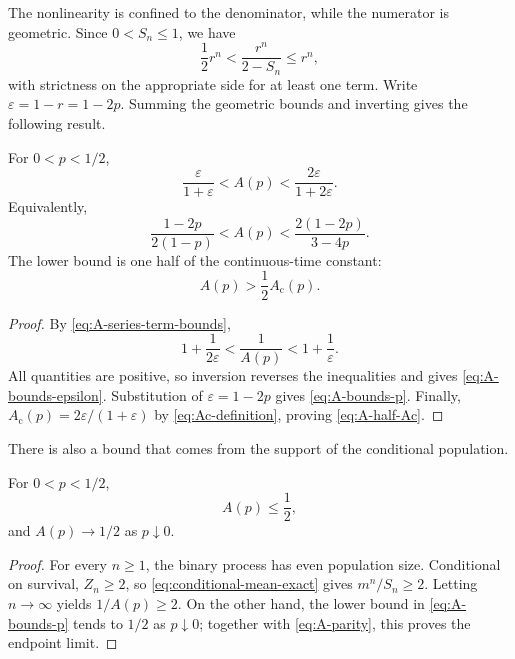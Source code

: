 The nonlinearity is confined to the denominator, while the numerator is geometric.
Since \(0<S_n\leq1\), we have
\begin{equation}
  \frac12r^n<\frac{r^n}{2-S_n}\leq r^n,
  \label{eq:A-series-term-bounds}
\end{equation}
with strictness on the appropriate side for at least one term.  Write
\(\varepsilon=1-r=1-2p\).  Summing the geometric bounds and inverting gives the
following result.

\begin{proposition}
\label{prop:A-bounds}
For \(0<p<1/2\),
\begin{equation}
  \frac{\varepsilon}{1+\varepsilon}
  <A(p)<
  \frac{2\varepsilon}{1+2\varepsilon}.
  \label{eq:A-bounds-epsilon}
\end{equation}
Equivalently,
\begin{equation}
  \frac{1-2p}{2(1-p)}
  <A(p)<
  \frac{2(1-2p)}{3-4p}.
  \label{eq:A-bounds-p}
\end{equation}
The lower bound is one half of the continuous-time constant:
\begin{equation}
  A(p)>\frac12A_{\mathrm c}(p).
  \label{eq:A-half-Ac}
\end{equation}
\end{proposition}

\begin{proof}
By \cref{eq:A-series-term-bounds},
\begin{equation}
  1+\frac{1}{2\varepsilon}
  <\frac{1}{A(p)}
  <1+\frac{1}{\varepsilon}.
\end{equation}
All quantities are positive, so inversion reverses the inequalities and gives
\cref{eq:A-bounds-epsilon}.  Substitution of
\(\varepsilon=1-2p\) gives \cref{eq:A-bounds-p}.  Finally,
\(A_{\mathrm c}(p)=2\varepsilon/(1+\varepsilon)\) by
\cref{eq:Ac-definition}, proving \cref{eq:A-half-Ac}.
\end{proof}

There is also a bound that comes from the support of the conditional population.

\begin{proposition}
\label{prop:A-parity}
For \(0<p<1/2\),
\begin{equation}
  A(p)\leq\frac12,
  \label{eq:A-parity}
\end{equation}
and \(A(p)\to1/2\) as \(p\downarrow0\).
\end{proposition}

\begin{proof}
For every \(n\geq1\), the binary process has even population size.  Conditional on
survival, \(Z_n\geq2\), so \cref{eq:conditional-mean-exact} gives
\(m^n/S_n\geq2\).  Letting \(n\to\infty\) yields \(1/A(p)\geq2\).
On the other hand, the lower bound in \cref{eq:A-bounds-p} tends to \(1/2\) as
\(p\downarrow0\); together with \cref{eq:A-parity}, this proves the endpoint limit.
\end{proof}

